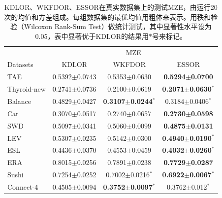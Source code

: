 \begin{table}[!htbp]
\caption{KDLOR、WKFDOR、ESSOR在真实数据集上的测试MZE，由运行20次的均值和方差组成。每组数据集的最优均值用粗体来表示。用秩和检验（Wilcoxon Rank-Sum Test）做统计测试，其中显著性水平设为0.05，表中显著优于KDLOR的结果用$*$号来标记。}
\label{table_essor_mze}
\centering
\begin{tabular}{l|ccc}
\toprule
& \multicolumn {3}{c}{MZE} \\
 \cmidrule {2-4}
Datasets & KDLOR & WKFDOR & ESSOR \\
\midrule
TAE & 0.5392$\pm$0.0743 & 0.5353$\pm$0.0630 &  {\bf 0.5294$\pm$0.0700} \\
Thyroid-new  & 0.2741$\pm$0.0736 & 0.2100$\pm$0.0619 &  {\bf 0.2071$\pm$0.0630}$^{*}$ \\
Balance & 0.4829$\pm$0.0427 & {\bf 0.3107$\pm$0.0244}$^{*}$ &  0.3184$\pm$0.0406$^{*}$ \\
Car & 0.3070$\pm$0.0517 & 0.2740$\pm$0.0657 &  {\bf 0.2730$\pm$0.0598} \\
SWD & 0.5097$\pm$0.0341 & 0.5060$\pm$0.0099 &  {\bf 0.4875$\pm$0.0131} \\
LEV & 0.5307$\pm$0.0235 & 0.5142$\pm$0.0300 &  {\bf 0.4940$\pm$0.0190}$^{*}$ \\
ESL & 0.4436$\pm$0.0370 & 0.4553$\pm$0.0459 &  {\bf 0.4032$\pm$0.0260}$^{*}$ \\
ERA  & 0.8015$\pm$0.0256 & 0.7891$\pm$0.0238 & {\bf 0.7729$\pm$0.0287} \\
Sushi & 0.7254$\pm$0.0252 & 0.7002$\pm$0.0216$^{*}$ & {\bf 0.6922$\pm$0.0067}$^{*}$ \\
Connect-4 & 0.4505$\pm$0.0094 & {\bf 0.3752$\pm$0.0097}$^{*}$ & 0.3762$\pm$0.012$^{*}$ \\
\bottomrule
\end{tabular}
\end{table}

